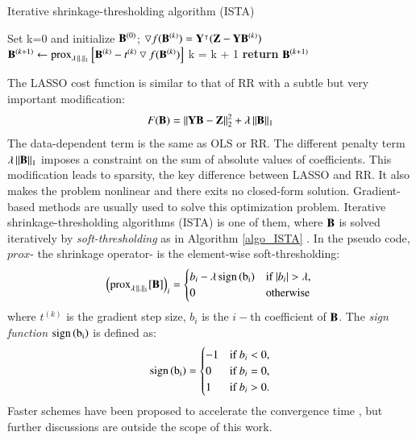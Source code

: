 \begin{algorithm}[t]
\caption{Iterative shrinkage-thresholding algorithm (ISTA)}\label{algo_ISTA}
\begin{algorithmic}[1]
\State Set k=0 and initialize $ \mathbf{B}^{(0)} $; 
	\State $ \bigtriangledown f(\mathbf{B}^{(k)}) = \mathbf{Y}^{\intercal}(\mathbf{Z}-\mathbf{Y}\mathbf{B}^{(k)})$ 
	\State $\mathbf{B}^{(k+1)} \gets \operatorname{prox}_{\lambda \operatorname{\Arrowvert \mathit{.} \Arrowvert_1 }} \left[ \mathbf{B}^{(k)} - t^{(k)} \bigtriangledown f(\mathbf{B}^{(k)}) \right] $
	\State k = k + 1 
\EndWhile
\State \textbf{return} $\mathbf{B}^{(k+1)}$
\end{algorithmic}
\end{algorithm}
 
The LASSO cost function is similar to that of RR with a subtle but very important modification:
\begin{equation}
F(\mathbf{B})= \Vert \mathbf{Y}\mathbf{B}-\mathbf{Z}\Vert^2_2 +\lambda \operatorname{\Arrowvert \mathit{\mathbf{B}} \Arrowvert_1 }
\label{eq: LASSO1}
\end{equation}
The data-dependent term is the same as OLS or RR. The different penalty term $ \lambda \operatorname{\Arrowvert \mathit{\mathbf{B}} \Arrowvert_1 }$ imposes a constraint on the sum of absolute values of coefficients. This modification leads to sparsity, the key difference between LASSO and RR. It also makes the problem nonlinear and there exits no closed-form solution. Gradient-based methods are usually used to solve this optimization problem. Iterative shrinkage-thresholding algorithms (ISTA) is one of them, where $ \mathbf{B} $ is solved iteratively by \textit{soft-thresholding} as in Algorithm \ref{algo_ISTA} \citep{daubechies2004iterative}. In the pseudo code, $ prox $- the shrinkage operator- is the element-wise soft-thresholding: 
\begin{equation}
\left(\prox_{\lambda \normone{.}}[\B]\right)_i =
\begin{cases}
b_i-\lambda \mysign{b_i} & \text{if } |b_i|>\lambda,
\\
0 & \text{otherwise }
\end{cases}
\end{equation}
where $ t^{(k)} $ is the gradient step size, $ b_i $ is the $ i- $th coefficient of $ \mathbf{B} $. The \textit{sign function} $ \operatorname{\operatorname{sign}{\left(b_i\right)}} $ is defined as:
\begin{equation}
 \operatorname{\operatorname{sign}{\left(b_i\right)}} =
\begin{cases}
-1 & \text{if } b_i<0,
\\
0 & \text{if } b_i=0,
\\
1  & \text{if } b_i>0.
\end{cases}
\end{equation}
Faster schemes have been proposed to accelerate the convergence time \citep{vonesch2008fast,beck2009fast}, but further discussions are outside the scope of this work.

